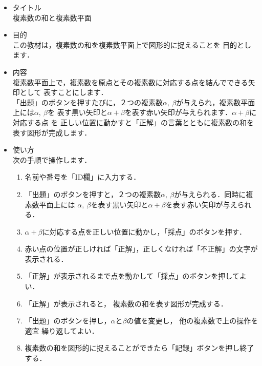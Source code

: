 \documentclass[20]{jarticle}
\begin{document}
\begin{itemize}
\item タイトル\\
複素数の和と複素数平面
\item 目的\\
この教材は，複素数の和を複素数平面上で図形的に捉えることを
目的とします．
\item 内容\\
複素数平面上で，複素数を原点とその複素数に対応する点を結んでできる矢印として%
表すことにします．\\
「出題」のボタンを押すたびに，２つの複素数$\alpha,\ \beta$が与えられ，複素数平面上には$\alpha,\ \beta$を
表す黒い矢印と$\alpha+\beta$を表す赤い矢印が与えられます．$\alpha+\beta$に対応する点
を%
正しい位置に動かすと「正解」の言葉とともに複素数の和を表す図形が完成します．
\item 使い方\\
次の手順で操作します．
\begin{enumerate}[(1)]
\item 名前や番号を「ID欄」に入力する．
\item 「出題」のボタンを押すと，２つの複素数$\alpha,\ \beta$が与えられる．同時に複素数平面上には
$\alpha,\ \beta$を表す黒い矢印と$\alpha+\beta$を表す赤い矢印が与えられる．
\item $\alpha+\beta$に対応する点を正しい位置に動かし，「採点」のボタンを押す．
\item 赤い点の位置が正しければ「正解」，正しくなければ「不正解」の文字が表示される．
\item 「正解」が表示されるまで点を動かして「採点」のボタンを押してよい．
\item 「正解」が表示されると，%
複素数の和を表す図形が完成する．
\item 「出題」のボタンを押し，$\alpha$と$\beta$の値を変更し， 他の複素数で上の操作を適宜
繰り返してよい．
\item 複素数の和を図形的に捉えることができたら「記録」ボタンを押し終了する．

\end{enumerate}

\end{itemize}
\end{document}
